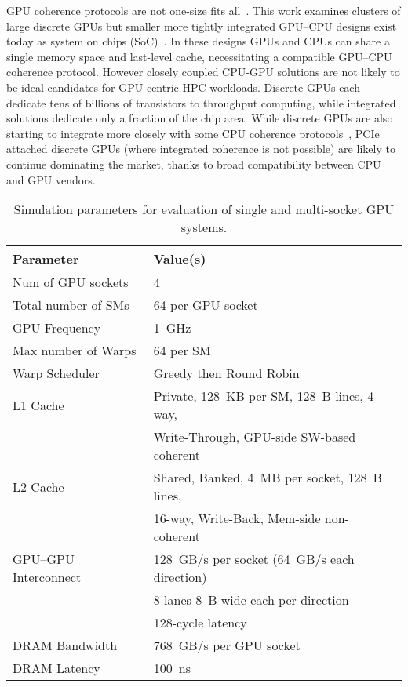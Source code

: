 GPU coherence protocols are not one-size fits all~\cite{sinclair2015efficient, Power2013, ZiabariTACO-16}.  
This work examines clusters 
of large discrete GPUs but smaller
more tightly integrated GPU--CPU designs exist today as system on chips (SoC)~\cite{AMDCARRIZO,INTELSKYLAKEINTEGRATED}.
In these designs GPUs and CPUs can share a single memory space and
last-level cache, necessitating a compatible GPU--CPU coherence protocol. 
However closely coupled CPU-GPU solutions are not likely to be ideal
candidates for GPU-centric HPC workloads.  Discrete GPUs each dedicate tens of billions of transistors 
to throughput computing, while integrated solutions dedicate only a fraction of the
chip area. While discrete GPUs are also starting to integrate more closely with 
some CPU coherence protocols~\cite{agarwal2016selective,ZiabariTACO-16},
PCIe attached discrete GPUs (where integrated coherence
is not possible) are likely to continue dominating the market, thanks to broad 
compatibility between CPU and GPU vendors.

\begin{table}[tp]
\begin{small}
\centering
\begin{tabular}{ll}
\toprule
\textbf{Parameter} & \textbf{Value(s)} \\
\toprule
Num of GPU sockets & 4 \\
\midrule
Total number of SMs & 64 per GPU socket \\
\midrule
GPU Frequency & \SI{1}{GHz} \\
\midrule
Max number of Warps & 64 per SM \\
\midrule
Warp Scheduler & Greedy then Round Robin \\
\midrule
L1 Cache & Private, \SI{128}{KB} per SM, \SI{128}{B} lines, 4-way, \\ 
& Write-Through, GPU-side SW-based coherent \\
\midrule
L2 Cache & Shared, Banked, \SI{4}{MB} per socket, \SI{128}{B} lines,  \\ 
& 16-way, Write-Back, Mem-side non-coherent\\
\midrule
GPU--GPU Interconnect & \SI{128}{GB/s} per socket (\SI{64}{GB/s} each direction) \\
& 8 lanes \SI{8}{B} wide each per direction \\
&128-cycle latency \\
\midrule
DRAM Bandwidth & \SI{768}{GB/s} per GPU socket\\
\midrule
DRAM Latency & \SI{100}{ns} \\
\toprule
\end{tabular}
\caption{Simulation parameters for evaluation of single and multi-socket GPU 
systems.}
\vspace{-0.75cm}
\label{tab:setup}
\end{small}
\end{table} 

